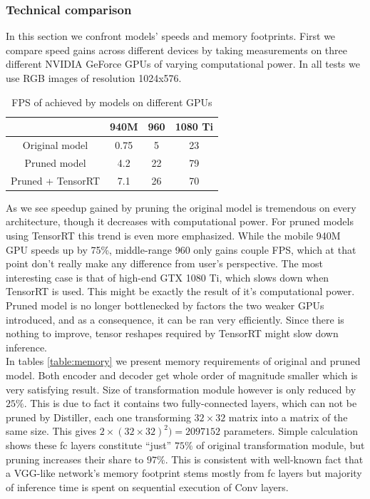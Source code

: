 \documentclass[../Main.tex]{subfiles}
\begin{document}
\subsubsection{Technical comparison}
In this section we confront models' speeds and memory footprints.
First we compare speed gains across different devices by taking measurements on three different
NVIDIA GeForce GPUs of varying computational power. In all tests we use RGB images
of resolution 1024x576. 
\begin{table}
\begin{center}
\begin{tabular}{|c|c|c|c|}
\hline
                  &  940M & 960 & 1080 Ti \\
\hline
Original model    &  0.75 & 5   & 23 \\
\hline
Pruned model      &  4.2  & 22  & 79 \\
\hline
Pruned + TensorRT &  7.1  & 26  & 70 \\
\hline
\end{tabular}
\end{center}
\caption{\label{table:speedup} FPS of achieved by models on different GPUs}
\end{table}
As we see speedup gained by pruning the original model is tremendous on
every architecture, though it decreases with computational power.
For pruned models using TensorRT this trend is even more emphasized.
While the mobile 940M GPU speeds up by 75\%, middle-range 960 only gains
couple FPS, which at that point don't really make any difference from user's
perspective. The most
interesting case is that of high-end GTX 1080 Ti, which slows down
when TensorRT is used. This might be exactly the result of it's computational power.
Pruned model is no longer bottlenecked by factors the two weaker GPUs
introduced, and as a consequence, it can be ran very efficiently.
Since there is nothing to improve, tensor reshapes required by TensorRT
might slow down inference. \\
In tables \ref{table:memory} we present memory requirements of original and pruned model.
Both encoder and decoder get whole order of magnitude smaller which is very
satisfying result. Size of transformation module however is only reduced by $25\%$.
This is due to fact it contains two fully-connected layers, which
can not be pruned by Distiller, each one
transforming $32\times32$ matrix into a matrix of the same size.
This gives $2\times\left(32\times32\right)^2)=2097152$ parameters.
Simple calculation shows these fc layers constitute ``just'' $75\%$
of original transformation module, but pruning increases their share to 
$97\%$. This is consistent with well-known fact that a VGG-like network's
memory footprint stems mostly from fc layers but majority of inference time
is spent on sequential execution of Conv layers.
\end{document}
